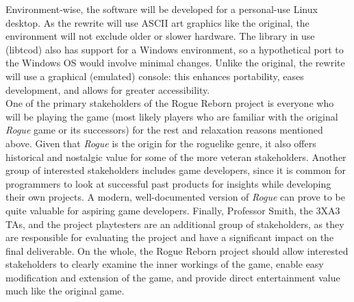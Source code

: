 \documentclass{article}
\begin{document}
Environment-wise, the software will be developed for a personal-use Linux desktop.  As the rewrite will use ASCII art graphics like the original, the environment will not exclude older or slower hardware.  The library in use (libtcod) also has support for a Windows environment, so a hypothetical port to the Windows OS would involve minimal changes.  Unlike the original, the rewrite will use a graphical (emulated) console: this enhances portability, eases development, and allows for greater accessibility.\\

One of the primary stakeholders of the Rogue Reborn project is everyone who will be playing the game (most likely players who are familiar with the original \textit{Rogue} game or its successors) for the rest and relaxation reasons mentioned above.  Given that \textit{Rogue} is the origin for the roguelike genre, it also offers historical and nostalgic value for some of the more veteran stakeholders.  Another group of interested stakeholders includes game developers, since it is common for programmers to look at successful past products for insights while developing their own projects.  A modern, well-documented version of \textit{Rogue} can prove to be quite valuable for aspiring game developers.  Finally, Professor Smith, the 3XA3 TAs, and the project playtesters are an additional group of stakeholders, as they are responsible for evaluating the project and have a significant impact on the final deliverable.  On the whole, the Rogue Reborn project should allow interested stakeholders to clearly examine the inner workings of the game, enable easy modification and extension of the game, and provide direct entertainment value much like the original game.
\end{document}
